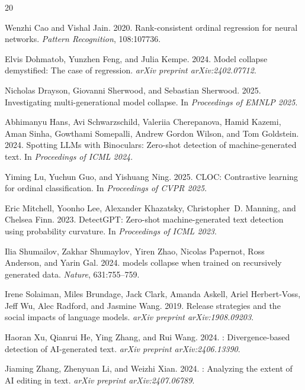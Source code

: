 \documentclass[11pt,a4paper]{article}
\begin{document}
\begin{thebibliography}{20}

Wenzhi Cao and Vishal Jain. 2020.
\newblock Rank-consistent ordinal regression for neural networks.
\newblock \emph{Pattern Recognition}, 108:107736.

Elvis Dohmatob, Yunzhen Feng, and Julia Kempe. 2024.
\newblock Model collapse demystified: The case of regression.
\newblock \emph{arXiv preprint arXiv:2402.07712}.

Nicholas Drayson, Giovanni Sherwood, and Sebastian Sherwood. 2025.
\newblock Investigating multi-generational model collapse.
\newblock In \emph{Proceedings of EMNLP 2025}.

Abhimanyu Hans, Avi Schwarzschild, Valeriia Cherepanova, Hamid Kazemi, Aman Sinha, Gowthami Somepalli, Andrew Gordon Wilson, and Tom Goldstein. 2024.
\newblock Spotting LLMs with Binoculars: Zero-shot detection of machine-generated text.
\newblock In \emph{Proceedings of ICML 2024}.

Yiming Lu, Yuchun Guo, and Yishuang Ning. 2025.
\newblock CLOC: Contrastive learning for ordinal classification.
\newblock In \emph{Proceedings of CVPR 2025}.

Eric Mitchell, Yoonho Lee, Alexander Khazatsky, Christopher~D. Manning, and Chelsea Finn. 2023.
\newblock DetectGPT: Zero-shot machine-generated text detection using probability curvature.
\newblock In \emph{Proceedings of ICML 2023}.

Ilia Shumailov, Zakhar Shumaylov, Yiren Zhao, Nicolas Papernot, Ross Anderson, and Yarin Gal. 2024.
 models collapse when trained on recursively generated data.
\newblock \emph{Nature}, 631:755--759.

Irene Solaiman, Miles Brundage, Jack Clark, Amanda Askell, Ariel Herbert-Voss, Jeff Wu, Alec Radford, and Jasmine Wang. 2019.
\newblock Release strategies and the social impacts of language models.
\newblock \emph{arXiv preprint arXiv:1908.09203}.

Haoran Xu, Qianrui He, Ying Zhang, and Rui Wang. 2024.
: Divergence-based detection of {AI}-generated text.
\newblock \emph{arXiv preprint arXiv:2406.13390}.

Jiaming Zhang, Zhenyuan Li, and Weizhi Xian. 2024.
: Analyzing the extent of {AI} editing in text.
\newblock \emph{arXiv preprint arXiv:2407.06789}.

\end{thebibliography}
\end{document}
